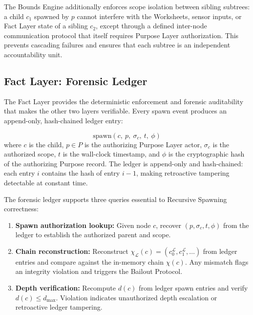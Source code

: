 The Bounds Engine additionally enforces scope isolation between sibling subtrees: a child $c_1$ spawned by $p$ cannot interfere with the Worksheets, sensor inputs, or Fact Layer state of a sibling $c_2$, except through a defined inter-node communication protocol that itself requires Purpose Layer authorization. This prevents cascading failures and ensures that each subtree is an independent accountability unit.

\subsection{Fact Layer: Forensic Ledger}
\label{sec:fact-ledger}

The Fact Layer provides the deterministic enforcement and forensic auditability that makes the other two layers verifiable. Every spawn event produces an append-only, hash-chained ledger entry:

\begin{equation}
\text{spawn}(c,\ p,\ \sigma_c,\ t,\ \phi)
\tag{3}
\end{equation}
where $c$ is the child, $p \in P$ is the authorizing Purpose Layer actor, $\sigma_c$ is the authorized scope, $t$ is the wall-clock timestamp, and $\phi$ is the cryptographic hash of the authorizing Purpose record. The ledger is append-only and hash-chained: each entry $i$ contains the hash of entry $i-1$, making retroactive tampering detectable at constant time.

The forensic ledger supports three queries essential to Recursive Spawning correctness:

\begin{enumerate}
    \itemsep0em
    \item \textbf{Spawn authorization lookup:} Given node $c$, recover $(p, \sigma_c, t, \phi)$ from the ledger to establish the authorized parent and scope.
    \item \textbf{Chain reconstruction:} Reconstruct $\chi_{\mathcal{L}}(c) = (c_0^{\mathcal{L}}, c_1^{\mathcal{L}}, \ldots)$ from ledger entries and compare against the in-memory chain $\chi(c)$. Any mismatch flags an integrity violation and triggers the Bailout Protocol.
    \item \textbf{Depth verification:} Recompute $d(c)$ from ledger spawn entries and verify $d(c) \leq d_{\max}$. Violation indicates unauthorized depth escalation or retroactive ledger tampering.
\end{enumerate}

